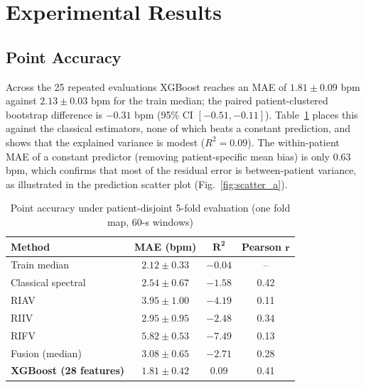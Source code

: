 \documentclass[conference]{IEEEtran}
\begin{document}
\section{Experimental Results}\label{sec:results}
\subsection{Point Accuracy}
Across the 25 repeated evaluations XGBoost reaches an MAE of $1.81\pm0.09$ bpm against $2.13\pm0.03$ bpm for the train median; the paired patient-clustered bootstrap difference is $-0.31$ bpm (95\% CI $[-0.51,-0.11]$). Table~\ref{tab:accuracy} places this against the classical estimators, none of which beats a constant prediction, and shows that the explained variance is modest ($R^2=0.09$). The within-patient MAE of a constant predictor (removing patient-specific mean bias) is only 0.63 bpm, which confirms that most of the residual error is between-patient variance, as illustrated in the prediction scatter plot (Fig.~\ref{fig:scatter_a}).

\begin{table}[!t]
\caption{Point accuracy under patient-disjoint 5-fold evaluation (one fold map, 60-s windows)}
\label{tab:accuracy}
\centering\footnotesize
\renewcommand{\arraystretch}{1.1}
\begin{tabular}{@{}lccc@{}}
\toprule
\textbf{Method} & \textbf{MAE (bpm)} & $\boldsymbol{R^2}$ & \textbf{Pearson} $\boldsymbol{r}$ \\
\midrule
Train median & $2.12\pm0.33$ & $-0.04$ & -- \\
Classical spectral & $2.54\pm0.67$ & $-1.58$ & 0.42 \\
RIAV & $3.95\pm1.00$ & $-4.19$ & 0.11 \\
RIIV & $2.95\pm0.95$ & $-2.48$ & 0.34 \\
RIFV & $5.82\pm0.53$ & $-7.49$ & 0.13 \\
Fusion (median) & $3.08\pm0.65$ & $-2.71$ & 0.28 \\
\textbf{XGBoost (28 features)} & $\mathbf{1.81}\pm0.42$ & $\mathbf{0.09}$ & 0.41 \\
\bottomrule
\end{tabular}
\par{}
\end{table}
\end{document}
